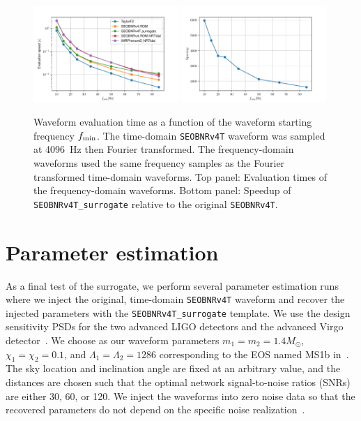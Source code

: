 \documentclass[prd,aps,letter,twocolumn,floatfix,notitlepage,nofootinbib]{revtex4-1}
\begin{document}
\begin{figure}[htb]
\centering
\includegraphics[width=0.49\textwidth]{Models_timings_FD_monotonic.pdf}
\includegraphics[width=0.49\textwidth]{SEOBNRv4T_surrogate_speedup_deltaF_monontonic.pdf}
\caption{Waveform evaluation time as a function of the waveform starting frequency $f_{\rm min}$. The time-domain \texttt{SEOBNRv4T} waveform was sampled at 4096~Hz then Fourier transformed. The frequency-domain waveforms used the same frequency samples as the Fourier transformed time-domain waveforms. Top panel: Evaluation times of the frequency-domain waveforms. Bottom panel: Speedup of \texttt{SEOBNRv4T\_surrogate} relative to the original \texttt{SEOBNRv4T}.}
\label{fig:timing}
\end{figure}

\section{Parameter estimation}
\label{sec:pe}

As a final test of the surrogate, we perform several parameter estimation runs where we inject the original, time-domain \texttt{SEOBNRv4T} waveform and recover the injected parameters with the \texttt{SEOBNRv4T\_surrogate} template. We use the design sensitivity PSDs for the two advanced LIGO detectors and the advanced Virgo detector~\cite{Aasi:2013wya}. We choose as our waveform parameters $m_1=m_2=1.4M_\odot$, $\chi_1=\chi_2=0.1$, and $\Lambda_1=\Lambda_2=1286$ corresponding to the EOS named MS1b in~\cite{ReadLackey2009}. The sky location and inclination angle are fixed at an arbitrary value, and the distances are chosen such that the optimal network signal-to-noise ratios (SNRs) are either 30, 60, or 120. We inject the waveforms into zero noise data so that the recovered parameters do not depend on the specific noise realization~\cite{NissankeHolzHughes2010}.
\end{document}
